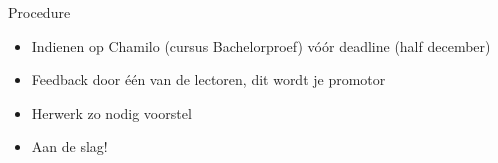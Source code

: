 \documentclass[aspectratio=169]{beamer}
\begin{document}
\begin{frame}{Procedure}
  
  \begin{itemize}
    \item Indienen op Chamilo (cursus Bachelorproef) vóór deadline (half december)
    \item Feedback door één van de lectoren, dit wordt je promotor
    \item Herwerk zo nodig voorstel
    \item Aan de slag!
  \end{itemize}
\end{frame}
\end{document}
